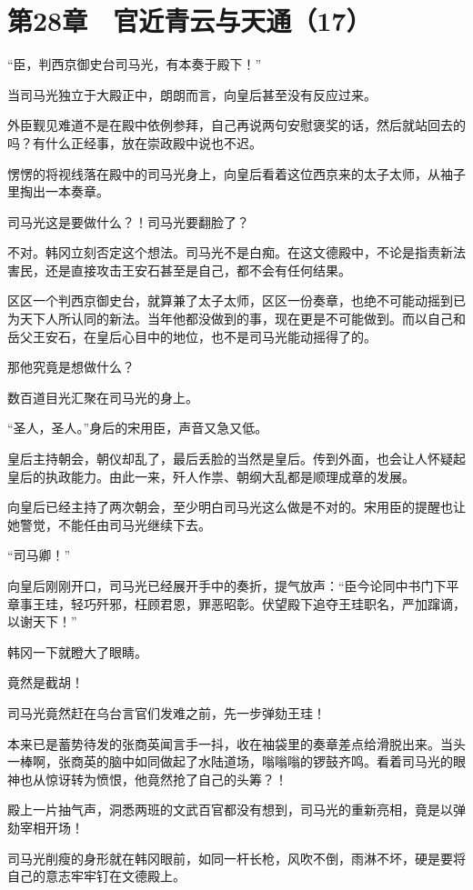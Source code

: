 \section{第28章　官近青云与天通（17）}

“臣，判西京御史台司马光，有本奏于殿下！”

当司马光独立于大殿正中，朗朗而言，向皇后甚至没有反应过来。

外臣觐见难道不是在殿中依例参拜，自己再说两句安慰褒奖的话，然后就站回去的吗？有什么正经事，放在崇政殿中说也不迟。

愣愣的将视线落在殿中的司马光身上，向皇后看着这位西京来的太子太师，从袖子里掏出一本奏章。

司马光这是要做什么？！司马光要翻脸了？

不对。韩冈立刻否定这个想法。司马光不是白痴。在这文德殿中，不论是指责新法害民，还是直接攻击王安石甚至是自己，都不会有任何结果。

区区一个判西京御史台，就算兼了太子太师，区区一份奏章，也绝不可能动摇到已为天下人所认同的新法。当年他都没做到的事，现在更是不可能做到。而以自己和岳父王安石，在皇后心目中的地位，也不是司马光能动摇得了的。

那他究竟是想做什么？

数百道目光汇聚在司马光的身上。

“圣人，圣人。”身后的宋用臣，声音又急又低。

皇后主持朝会，朝仪却乱了，最后丢脸的当然是皇后。传到外面，也会让人怀疑起皇后的执政能力。由此一来，歼人作祟、朝纲大乱都是顺理成章的发展。

向皇后已经主持了两次朝会，至少明白司马光这么做是不对的。宋用臣的提醒也让她警觉，不能任由司马光继续下去。

“司马卿！”

向皇后刚刚开口，司马光已经展开手中的奏折，提气放声：“臣今论同中书门下平章事王珪，轻巧歼邪，枉顾君恩，罪恶昭彰。伏望殿下追夺王珪职名，严加蹿谪，以谢天下！”

韩冈一下就瞪大了眼睛。

竟然是截胡！

司马光竟然赶在乌台言官们发难之前，先一步弹劾王珪！

本来已是蓄势待发的张商英闻言手一抖，收在袖袋里的奏章差点给滑脱出来。当头一棒啊，张商英的脑中如同做起了水陆道场，嗡嗡嗡的锣鼓齐鸣。看着司马光的眼神也从惊讶转为愤恨，他竟然抢了自己的头筹？！

殿上一片抽气声，洞悉两班的文武百官都没有想到，司马光的重新亮相，竟是以弹劾宰相开场！

司马光削瘦的身形就在韩冈眼前，如同一杆长枪，风吹不倒，雨淋不坏，硬是要将自己的意志牢牢钉在文德殿上。

